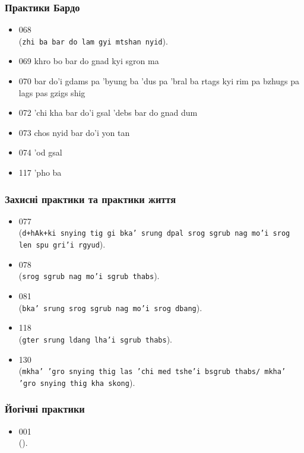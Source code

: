 \documentclass{article}
\begin{document}
\subsubsection{Практики Бардо}

\begingroup\raggedright
\begin{itemize}
\item 068  \\ (\texttt{zhi ba bar do lam gyi mtshan nyid}).
\item 069 khro bo bar do gnad kyi sgron ma
\item 070 bar do'i gdams pa 'byung ba 'dus pa 'bral ba rtags kyi rim pa bzhugs pa lags pas gzigs shig
\item 072 'chi kha bar do'i gsal 'debs bar do gnad dum
\item 073 chos nyid bar do'i yon tan
\item 074 'od gsal
\item 117 'pho ba
\end{itemize}
\endgroup

\subsubsection{Захисні практики та практики життя}

\begingroup\raggedright
\begin{itemize}
\item 077  \\ (\texttt{d+hAk+ki snying tig gi bka' srung dpal srog sgrub nag mo'i srog len spu gri'i rgyud}).
\item 078  \\ (\texttt{srog sgrub nag mo'i sgrub thabs}).
\item 081  \\ (\texttt{bka' srung srog sgrub nag mo'i srog dbang}).
\item 118  \\ (\texttt{gter srung ldang lha'i sgrub thabs}).
\item 130  \\ (\texttt{mkha' 'gro snying thig las 'chi med tshe'i bsgrub thabs/ mkha' 'gro snying thig kha skong}).
\end{itemize}
\endgroup

\subsubsection{Йогічні практики}

\begingroup\raggedright
\begin{itemize}
\item 001  \\ (\texttt{}).
\end{itemize}
\endgroup
\end{document}
